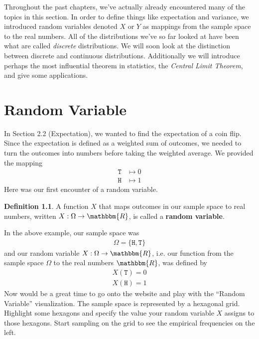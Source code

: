 \documentclass{tufte-book}
\newcommand\real{\mathbbm{R}}
\newcommand\hd{\texttt{H}}
\newcommand\tl{\texttt{T}}
\theoremstyle{definition}
\numberwithin{theorem}{section}
\newtheorem{definition}[theorem]{Definition}
\numberwithin{definition}{section}
\numberwithin{lemma}{section}
\numberwithin{corollary}{section}
\numberwithin{proposition}{section}
\numberwithin{remark}{section}
\numberwithin{claim}{section}
\numberwithin{observation}{section}
\numberwithin{fact}{section}
\numberwithin{assumption}{section}
\numberwithin{example}{section}
\numberwithin{exercise}{section}
\begin{document}
Throughout the past chapters, we've actually already encountered many of the topics in this section. In order to define things like expectation and variance, we introduced random variables denoted $X$ or $Y$ as mappings from the sample space to the real numbers. All of the distributions we've so far looked at have been what are called \textit{discrete} distributions. We will soon look at the distinction between discrete and continuous distributions. Additionally we will introduce perhaps the most influential theorem in statistics, the \textit{Central Limit Theorem}, and give some applications.



\chapter{Random Variable}

In Section 2.2 (Expectation), we wanted to find the expectation of a coin flip. Since the expectation is defined as a weighted sum of outcomes, we needed to turn the outcomes into numbers before taking the weighted average. We provided the mapping
\begin{align*}
\tl &\mapsto 0 \\
\hd &\mapsto 1
\end{align*}
Here was our first encounter of a random variable. 
\begin{definition}
A function $X$ that maps outcomes in our sample space to real numbers, written $X : \Omega \to \real$, is called a \textbf{random variable}.
\end{definition}
In the above example, our sample space was
\begin{align*}
\Omega = \{\hd , \tl\}
\end{align*}
and our random variable $X : \Omega \to \real$, i.e. our function from the sample space $\Omega$ to the real numbers $\real$, was defined by
\begin{align*}
X(\tl) = 0 \\
X(\hd) = 1
\end{align*}
Now would be a great time to go onto the website and play with the ``Random Variable'' visualization. The sample space is represented by a hexagonal grid. Highlight some hexagons and specify the value your random variable $X$ assigns to those hexagons. Start sampling on the grid to see the empirical frequencies on the left.

\end{document}
